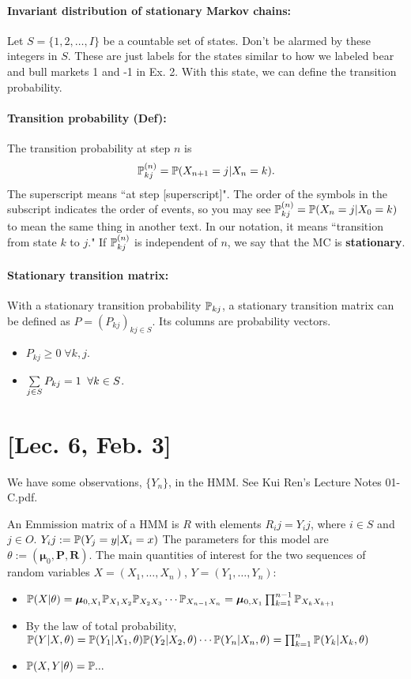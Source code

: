 \paragraph*{Invariant distribution of stationary Markov chains: } Let $S = \{ 1, 2, \ldots, I \}$ be a countable set of states. Don't be alarmed by these integers in $S$. These are just labels for the states similar to how we labeled bear and bull markets 1 and -1 in Ex. 2. With this state, we can define the transition probability. 

\paragraph*{Transition probability (Def): } The transition probability at step $n$ is 
\[ 
	\mathbb{P}_{kj}^{(n)} = \mathbb{P} (X_{n+1} = j | X_n = k ) .
\] 
The superscript means ``at step [superscript]". The order of the symbols in the subscript indicates the order of events, so you may see $\mathbb{P}_{kj}^{(n)} = \mathbb{P} (X_n = j | X_0 = k)$ to mean the same thing in another text. In our notation, it means ``transition from state $k$ to $j$."  If $\mathbb{P}_{kj}^{(n)}$ is independent of $n$, we say that the MC is \textbf{stationary}. 

\paragraph*{Stationary transition matrix: } With a stationary transition probability $\mathbb{P}_{kj}$, a stationary transition matrix can be defined as $P = (P_{kj})_{kj\in S}$. 
Its columns are probability vectors.
\begin{itemize}
	\item $P_{kj} \geq 0\; \forall k, j$. 
	\item $\sum\limits_{j\in S} P_{kj} = 1 \;\; \forall k \in S $.  
\end{itemize}


\section{[Lec. 6, Feb. 3]}

We have some observations, $\{ Y_n \}$,  in the HMM. See Kui Ren's Lecture Notes 01-C.pdf. 

An Emmission matrix of a HMM is $R$ with elements $R_ij = Y_ij$, where $i\in S$ and $j \in O$. $Y_ij := \mathbb{P}(Y_j = y | X_i = x)$
The parameters for this model are $\theta := (\bm{\mu}_0, \bm{P}, \bm{R})$. The main quantities of interest for the two sequences of random variables $X = (X_1, \ldots, X_n)$, $Y= (Y_1, \ldots, Y_n)$:
\begin{itemize}
	\item $\mathbb{P}(X | \theta) = \bm{\mu}_{0, X_1} \mathbb{P}_{X_1X_2} \mathbb{P}_{X_2X_3} \cdots \mathbb{P}_{X_{n-1}X_n} = \bm{\mu}_{0, X_1} \prod_{k=1}^{n-1} \mathbb{P}_{X_k X_{k+1}}$

	\item By the law of total probability, $\mathbb{P}(Y|X, \theta) = \mathbb{P}(Y_1| X_1, \theta)\mathbb{P}(Y_2| X_2, \theta)\cdots \mathbb{P}(Y_n | X_n, \theta) = \prod_{k=1}^n \mathbb{P}(Y_k | X_k, \theta)$

	\item $\mathbb{P}(X, Y | \theta) = \mathbb{P}...$
\end{itemize} 

